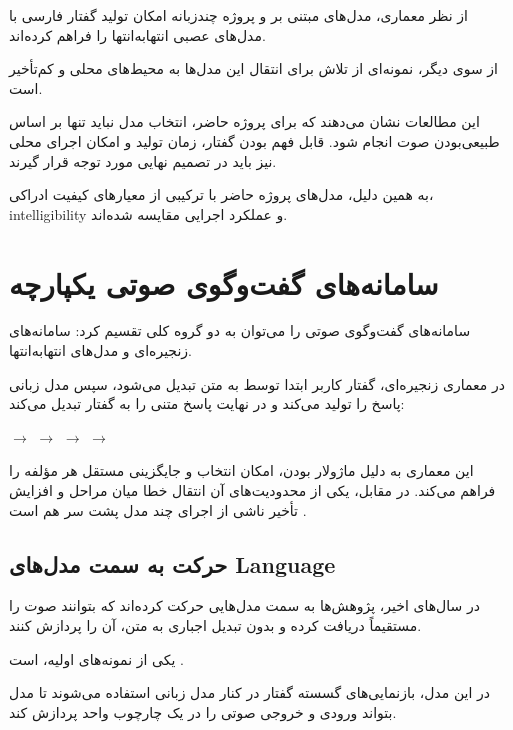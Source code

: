 از نظر معماری، مدل‌های مبتنی بر  و پروژه چندزبانه 
امکان تولید گفتار فارسی با مدل‌های عصبی انتهابه‌انتها را
فراهم کرده‌اند.

از سوی دیگر،  نمونه‌ای از تلاش برای انتقال این مدل‌ها
به محیط‌های محلی و کم‌تأخیر است.

این مطالعات نشان می‌دهند که برای پروژه حاضر، انتخاب مدل 
نباید تنها بر اساس طبیعی‌بودن صوت انجام شود.
قابل فهم بودن گفتار، زمان تولید و امکان اجرای محلی نیز باید
در تصمیم نهایی مورد توجه قرار گیرند.

به همین دلیل، مدل‌های  پروژه حاضر با ترکیبی از معیارهای
کیفیت ادراکی، intelligibility و عملکرد اجرایی مقایسه
شده‌اند.
\section{سامانه‌های گفت‌وگوی صوتی یکپارچه}

سامانه‌های گفت‌وگوی صوتی را می‌توان به دو گروه کلی تقسیم کرد:
سامانه‌های زنجیره‌ای و مدل‌های انتهابه‌انتها.

در معماری زنجیره‌ای، گفتار کاربر ابتدا توسط  به متن تبدیل
می‌شود، سپس مدل زبانی پاسخ را تولید می‌کند و در نهایت 
پاسخ متنی را به گفتار تبدیل می‌کند:

\begin{center}
$\longrightarrow$
$\longrightarrow$
$\longrightarrow$
$\longrightarrow$
\end{center}

این معماری به دلیل ماژولار بودن، امکان انتخاب و جایگزینی مستقل
هر مؤلفه را فراهم می‌کند.
در مقابل، یکی از محدودیت‌های آن انتقال خطا میان مراحل و افزایش
تأخیر ناشی از اجرای چند مدل پشت سر هم است
\cite{cui2024speechlmsurvey}.


\subsection{حرکت به سمت مدل‌های  Language }

در سال‌های اخیر، پژوهش‌ها به سمت مدل‌هایی حرکت کرده‌اند که
بتوانند صوت را مستقیماً دریافت کرده و بدون تبدیل اجباری به متن،
آن را پردازش کنند.

یکی از نمونه‌های اولیه،
است
\cite{zhang2023speechgpt}.

در این مدل، بازنمایی‌های گسسته گفتار در کنار مدل زبانی استفاده
می‌شوند تا مدل بتواند ورودی و خروجی صوتی را در یک چارچوب واحد
پردازش کند.

